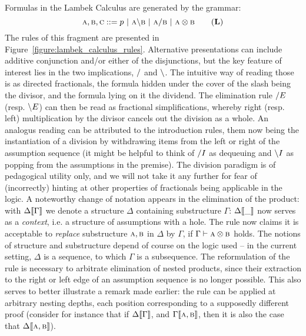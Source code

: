 Formulas in the Lambek Calculus are generated by the grammar:
\begin{equation}
\prop{A}, \prop{B}, \prop{C} ::= p \ | \ \prop{A} \divleft \prop{B} \ | \ \prop{A} \divright \prop{B} \ | \ \prop{A} \otimes \prop{B}
\tag{$\LC$}
\label{grammar:LC}
\end{equation}
The rules of this fragment are presented in Figure~\ref{figure:lambek_calculus_rules}.
Alternative presentations can include additive conjunction and/or either of the disjunctions, but the key feature of interest lies in the two implications, $/$ and $\backslash$.
The intuitive way of reading those is as directed fractionals, the formula hidden under the cover of the slash being the divisor, and the formula lying on it the dividend.
The elimination rule $/ E$ (resp. $\backslash E$) can then be read as fractional simplifications, whereby right (resp. left) multiplication by the divisor cancels out the division as a whole.
An analogus reading can be attributed to the introduction rules, them now being the instantiation of a division by withdrawing items from the left or right of the assumption sequence (it might be helpful to think of $/ I$ as dequeuing and $\backslash I$ as popping from the assumptions in the premise).
The division paradigm is of pedagogical utility only, and we will not take it any further for fear of (incorrectly) hinting at other properties of fractionals being applicable in the logic.
A noteworthy change of notation appears in the elimination of the product: with $\Delta\llbracket{\Gamma}\rrbracket$ we denote a structure $\Delta$ containing substructure $\Gamma$: $\Delta\llbracket{\_}\rrbracket$ now serves as a \textit{context}, i.e. a structure of assumptions with a hole.
The rule now claims it is acceptable to \textit{replace} substructure $\smallprop{A}, \smallprop{B}$ in $\Delta$ by $\Gamma$, if $\Gamma \vdash \smallprop{A}\otimes\smallprop{B}$ holds.
The notions of structure and substructure depend of course on the logic used -- in the current setting, $\Delta$ is a sequence, to which $\Gamma$ is a subsequence. 
The reformulation of the rule is necessary to arbitrate elimination of nested products, since their extraction to the right or left edge of an assumption sequence is no longer possible.
This also serves to better illustrate a remark made earlier: the rule can be applied at arbitrary nesting depths, each position corresponding to a supposedly different proof (consider for instance that if $\Delta\llbracket{\Gamma}\rrbracket$, and $\Gamma\ctx{\smallprop{A}, \smallprop{B}}$, then it is also the case that $\Delta\ctx{\prop{A}, \prop{B}}$).

